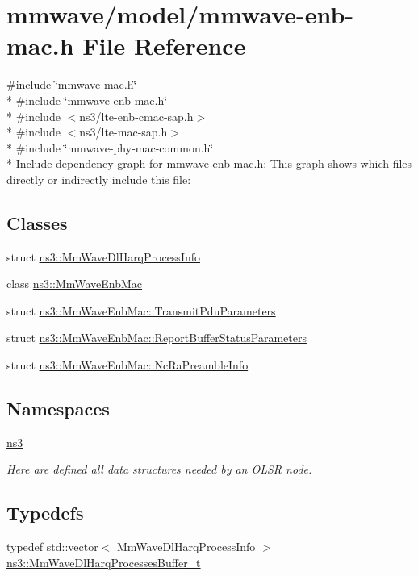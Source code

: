 \hypertarget{mmwave-enb-mac_8h}{}\section{mmwave/model/mmwave-\/enb-\/mac.h File Reference}
\label{mmwave-enb-mac_8h}
{\ttfamily \#include \char`\"{}mmwave-\/mac.\+h\char`\"{}}\\*
{\ttfamily \#include \char`\"{}mmwave-\/enb-\/mac.\+h\char`\"{}}\\*
{\ttfamily \#include $<$ns3/lte-\/enb-\/cmac-\/sap.\+h$>$}\\*
{\ttfamily \#include $<$ns3/lte-\/mac-\/sap.\+h$>$}\\*
{\ttfamily \#include \char`\"{}mmwave-\/phy-\/mac-\/common.\+h\char`\"{}}\\*
Include dependency graph for mmwave-\/enb-\/mac.h\+:
This graph shows which files directly or indirectly include this file\+:
\subsection*{Classes}
\begin{DoxyCompactItemize}
\item 
struct \hyperlink{structns3_1_1MmWaveDlHarqProcessInfo}{ns3\+::\+Mm\+Wave\+Dl\+Harq\+Process\+Info}
\item 
class \hyperlink{classns3_1_1MmWaveEnbMac}{ns3\+::\+Mm\+Wave\+Enb\+Mac}
\item 
struct \hyperlink{structns3_1_1MmWaveEnbMac_1_1TransmitPduParameters}{ns3\+::\+Mm\+Wave\+Enb\+Mac\+::\+Transmit\+Pdu\+Parameters}
\item 
struct \hyperlink{structns3_1_1MmWaveEnbMac_1_1ReportBufferStatusParameters}{ns3\+::\+Mm\+Wave\+Enb\+Mac\+::\+Report\+Buffer\+Status\+Parameters}
\item 
struct \hyperlink{structns3_1_1MmWaveEnbMac_1_1NcRaPreambleInfo}{ns3\+::\+Mm\+Wave\+Enb\+Mac\+::\+Nc\+Ra\+Preamble\+Info}
\end{DoxyCompactItemize}
\subsection*{Namespaces}
\begin{DoxyCompactItemize}
\item 
 \hyperlink{namespacens3}{ns3}
\begin{DoxyCompactList}\small\item\em Here are defined all data structures needed by an O\+L\+SR node. \end{DoxyCompactList}\end{DoxyCompactItemize}
\subsection*{Typedefs}
\begin{DoxyCompactItemize}
\item 
typedef std\+::vector$<$ Mm\+Wave\+Dl\+Harq\+Process\+Info $>$ \hyperlink{namespacens3_a7bb8c3b0b6663dc0e37e226a167498dd}{ns3\+::\+Mm\+Wave\+Dl\+Harq\+Processes\+Buffer\+\_\+t}
\end{DoxyCompactItemize}
